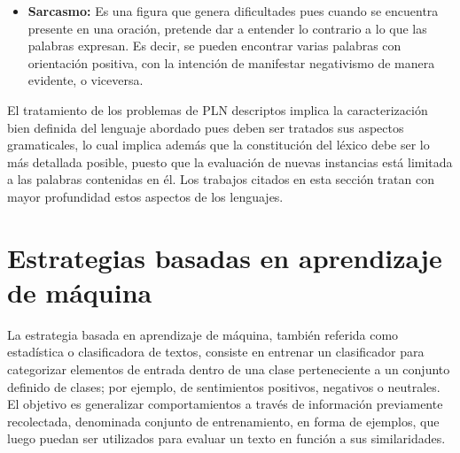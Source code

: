 {\begin{itemize}
\item \textbf{Sarcasmo:} Es una figura que genera dificultades pues cuando se encuentra presente en una oraci\'on, pretende dar a entender lo contrario a lo que las palabras expresan. Es decir, se pueden encontrar varias palabras con orientaci\'on positiva, con la intenci\'on de manifestar negativismo de manera evidente, o viceversa.

\end{itemize}

El tratamiento de los problemas de PLN descriptos implica la caracterizaci\'on bien definida del lenguaje abordado pues deben ser tratados sus aspectos gramaticales, lo cual implica adem\'as que la constituci\'on del l\'exico debe ser lo m\'as detallada posible, puesto que la evaluaci\'on de nuevas instancias est\'a limitada a las palabras contenidas en \'el. Los trabajos citados en esta secci\'on tratan con mayor profundidad estos aspectos de los lenguajes.

\section{Estrategias basadas en aprendizaje de m\'aquina}

La estrategia basada en aprendizaje de m\'aquina, tambi\'en referida como estad\'istica o clasificadora de textos, consiste en entrenar un clasificador para categorizar elementos de entrada dentro de una clase perteneciente a un conjunto definido de clases; por ejemplo, de sentimientos positivos, negativos o neutrales. El objetivo es generalizar comportamientos a trav\'es de informaci\'on previamente recolectada, denominada conjunto de entrenamiento, en forma de ejemplos, que luego puedan ser utilizados para evaluar un texto en funci\'on a sus similaridades.
\newline

}
